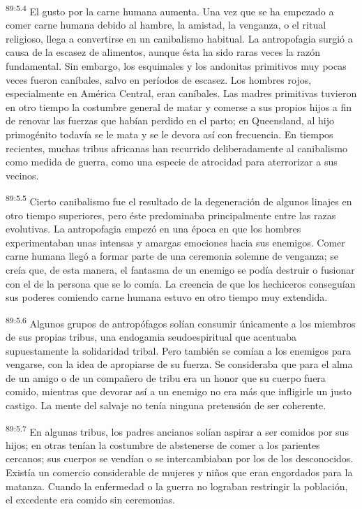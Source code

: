 \documentclass[twoside, 11pt]{book}
\begin{document}
\par
\textsuperscript{89:5.4} El gusto por la carne humana aumenta. Una vez que se ha empezado a comer carne humana debido al hambre, la amistad, la venganza, o el ritual religioso, llega a convertirse en un canibalismo habitual. La antropofagia surgió a causa de la escasez de alimentos, aunque ésta ha sido raras veces la razón fundamental. Sin embargo, los esquimales y los andonitas primitivos muy pocas veces fueron caníbales, salvo en períodos de escasez. Los hombres rojos, especialmente en América Central, eran caníbales. Las madres primitivas tuvieron en otro tiempo la costumbre general de matar y comerse a sus propios hijos a fin de renovar las fuerzas que habían perdido en el parto; en Queensland, al hijo primogénito todavía se le mata y se le devora así con frecuencia. En tiempos recientes, muchas tribus africanas han recurrido deliberadamente al canibalismo como medida de guerra, como una especie de atrocidad para aterrorizar a sus vecinos.

\par
\textsuperscript{89:5.5} Cierto canibalismo fue el resultado de la degeneración de algunos linajes en otro tiempo superiores, pero éste predominaba principalmente entre las razas evolutivas. La antropofagia empezó en una época en que los hombres experimentaban unas intensas y amargas emociones hacia sus enemigos. Comer carne humana llegó a formar parte de una ceremonia solemne de venganza; se creía que, de esta manera, el fantasma de un enemigo se podía destruir o fusionar con el de la persona que se lo comía. La creencia de que los hechiceros conseguían sus poderes comiendo carne humana estuvo en otro tiempo muy extendida.

\par
\textsuperscript{89:5.6} Algunos grupos de antropófagos solían consumir únicamente a los miembros de sus propias tribus, una endogamia seudoespiritual que acentuaba supuestamente la solidaridad tribal. Pero también se comían a los enemigos para vengarse, con la idea de apropiarse de su fuerza. Se consideraba que para el alma de un amigo o de un compañero de tribu era un honor que su cuerpo fuera comido, mientras que devorar así a un enemigo no era más que infligirle un justo castigo. La mente del salvaje no tenía ninguna pretensión de ser coherente.

\par
\textsuperscript{89:5.7} En algunas tribus, los padres ancianos solían aspirar a ser comidos por sus hijos; en otras tenían la costumbre de abstenerse de comer a los parientes cercanos; sus cuerpos se vendían o se intercambiaban por los de los desconocidos. Existía un comercio considerable de mujeres y niños que eran engordados para la matanza. Cuando la enfermedad o la guerra no lograban restringir la población, el excedente era comido sin ceremonias.
\end{document}
